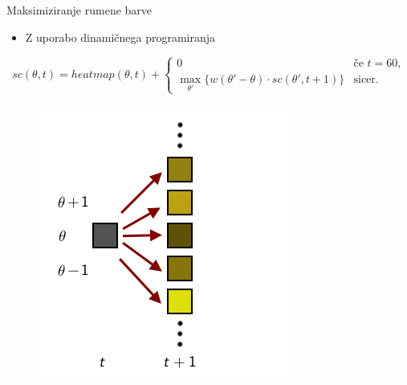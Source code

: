 \begin{frame}{Maksimiziranje rumene barve}
  \begin{itemize}
    \item Z uporabo dinamičnega programiranja
  \end{itemize}

\begin{displaymath}
  sc(\theta, t) = heatmap(\theta, t) + \left\{ \begin{array}{ll}
                                            0 & \textrm{če $t = 60$,}\\
                                            \displaystyle \max_{\theta'}\{w(\theta'-\theta) \cdot sc(\theta', t+1)\} & \textrm{sicer.}
  \end{array} \right.
\end{displaymath}
  \begin{figure}
    \includegraphics[scale=0.57]{img/dp.png}
  \end{figure}
\end{frame}

